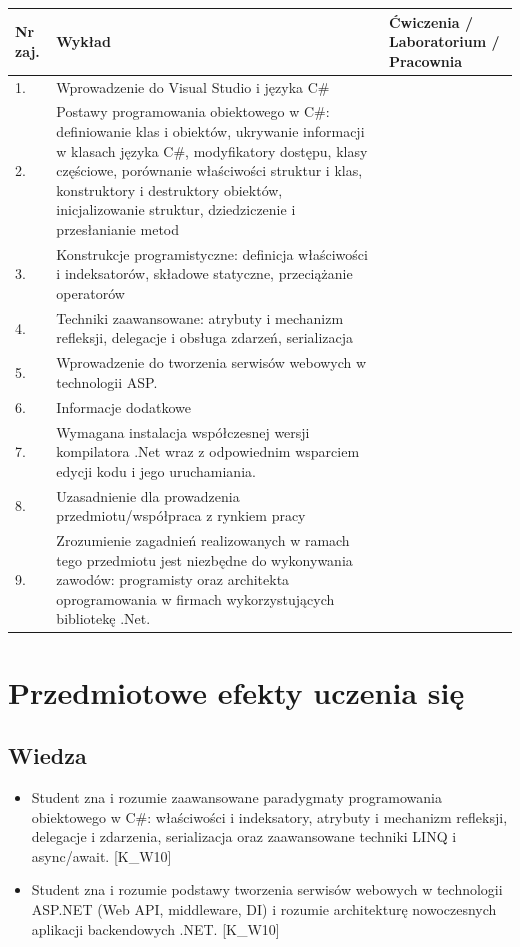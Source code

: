 \documentclass[12pt, a4paper]{article}
\begin{document}
\begin{longtable}{|p{1.5cm}|p{6.5cm}|p{6.5cm}|}
\hline
\textbf{Nr zaj.} & \textbf{Wykład} & \textbf{Ćwiczenia / Laboratorium / Pracownia} \\\hline
\endhead
  \hline
  1. & Wprowadzenie do Visual Studio i języka C\# &  \\
  \hline
  2. & Postawy programowania obiektowego w C\#: definiowanie klas i obiektów, ukrywanie informacji w klasach języka C\#, modyfikatory dostępu, klasy częściowe, porównanie właściwości struktur i klas, konstruktory i destruktory obiektów, inicjalizowanie struktur, dziedziczenie i przesłanianie metod &  \\
  \hline
  3. & Konstrukcje programistyczne: definicja właściwości i indeksatorów, składowe statyczne, przeciążanie operatorów &  \\
  \hline
  4. & Techniki zaawansowane: atrybuty i mechanizm refleksji, delegacje i obsługa zdarzeń, serializacja &  \\
  \hline
  5. & Wprowadzenie do tworzenia serwisów webowych w technologii ASP. &  \\
  \hline
  6. & Informacje dodatkowe &  \\
  \hline
  7. & Wymagana instalacja współczesnej wersji kompilatora .Net wraz z odpowiednim wsparciem edycji kodu i jego uruchamiania. &  \\
  \hline
  8. & Uzasadnienie dla prowadzenia przedmiotu/współpraca z rynkiem pracy &  \\
  \hline
  9. & Zrozumienie zagadnień realizowanych w ramach tego przedmiotu jest niezbędne do wykonywania zawodów: programisty oraz architekta oprogramowania w firmach wykorzystujących bibliotekę .Net. &  \\
  \hline
\end{longtable}

\section{Przedmiotowe efekty uczenia się}

\subsection*{Wiedza}
\begin{itemize}
  \item Student zna i rozumie zaawansowane paradygmaty programowania obiektowego w C\#: właściwości i indeksatory, atrybuty i mechanizm refleksji, delegacje i zdarzenia, serializacja oraz zaawansowane techniki LINQ i async/await. [K\_W10]
  \item Student zna i rozumie podstawy tworzenia serwisów webowych w technologii ASP.NET (Web API, middleware, DI) i rozumie architekturę nowoczesnych aplikacji backendowych .NET. [K\_W10]
\end{itemize}
\end{document}
